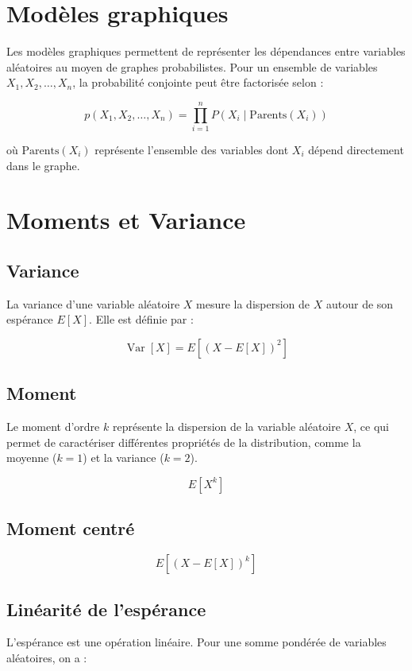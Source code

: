 \documentclass{article}
\begin{document}
\section{Modèles graphiques}

Les modèles graphiques permettent de représenter les dépendances entre variables aléatoires au moyen de graphes probabilistes. Pour un ensemble de variables $X_1, X_2, \dotsc, X_n$, la probabilité conjointe peut être factorisée selon :

\[
p(X_1, X_2, \dotsc, X_n) = \prod_{i=1}^n P\left( X_i \mid \text{Parents}(X_i) \right)
\]

où $\text{Parents}(X_i)$ représente l'ensemble des variables dont $X_i$ dépend directement dans le graphe.

\section{Moments et Variance}

\subsection{Variance}

La variance d'une variable aléatoire $X$ mesure la dispersion de $X$ autour de son espérance $E[X]$. Elle est définie par :

\[
\operatorname{Var}[X] = E\left[ (X - E[X])^2 \right]
\]

\subsection{Moment}

Le moment d'ordre $k$ représente la dispersion de la variable aléatoire $X$, ce qui permet de caractériser différentes propriétés de la distribution, comme la moyenne ($k = 1$) et la variance ($k=2$).

\[
E[X^k]
\]

\subsection{Moment centré}

\[
E[(X-E[X])^k]
\]
\subsection{Linéarité de l'espérance}

L'espérance est une opération linéaire. Pour une somme pondérée de variables aléatoires, on a :
\end{document}
